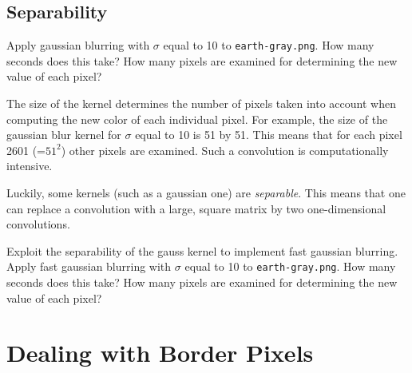 \documentclass{book}
\begin{document}

\subsection{Separability}

\begin{exercise}
Apply gaussian blurring with $\sigma$ equal to 10 to \texttt{earth-gray.png}. How many seconds does this take? How many pixels are examined for determining the new value of each pixel?
\end{exercise}

The size of the kernel determines the number of pixels taken into account when computing the new color of each individual pixel. For example, the size of the gaussian blur kernel for $\sigma$ equal to 10 is 51 by 51. This means that for each pixel 2601 (=$51^2$) other pixels are examined. Such a convolution is computationally intensive.

Luckily, some kernels (such as a gaussian one) are \emph{separable}. This means that one can replace a convolution with a large, square matrix by two one-dimensional convolutions.  

\begin{exercise}
Exploit the separability of the gauss kernel to implement fast gaussian blurring. Apply fast gaussian blurring with $\sigma$ equal to 10 to \texttt{earth-gray.png}. How many seconds does this take? How many pixels are examined for determining the new value of each pixel?
\end{exercise}




\section{Dealing with Border Pixels}\label{sec:border-pixels}

\end{document}
